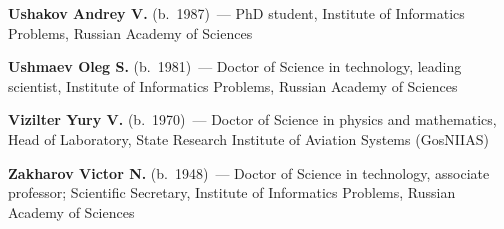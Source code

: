 \begin{multicols}{2}
\vspace*{7pt}

\noindent
\textbf{Ushakov Andrey V.} (b.\ 1987)~--- PhD student, Institute of Informatics Problems, Russian
Academy of Sciences

\vspace*{7pt}

\noindent
\textbf{Ushmaev Oleg S.} (b.\ 1981)~--- Doctor of Science in technology, 
leading scientist, Institute of Informatics Problems, Russian Academy of Sciences 

 \vspace*{7pt}

\noindent
\textbf{Vizilter Yury V.} (b.\ 1970)~--- Doctor of Science in physics and mathematics, 
Head of Laboratory, State Research Institute of Aviation Systems (GosNIIAS)

\vspace*{7pt}

\noindent
\textbf{Zakharov Victor N.} (b.\ 1948)~--- Doctor of Science in technology, 
associate professor; Scientific Secretary, Institute of Informatics Problems, 
Russian Academy of Sciences



\end{multicols}
\newpage
